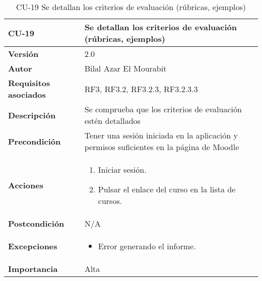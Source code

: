 \begin{table}[H]
	\centering
	\begin{tabularx}{\linewidth}{ p{} p{} }
		\toprule
		\textbf{CU-19}    & \textbf{Se detallan los criterios de evaluación (rúbricas, ejemplos)}\\
		\toprule
		\textbf{Versión}              & 2.0    \\
		\textbf{Autor}                & Bilal Azar El Mourabit \\
		\textbf{Requisitos asociados} & RF3, RF3.2, RF3.2.3, RF3.2.3.3 \\
		\textbf{Descripción}          & Se comprueba que los criterios de evaluación estén detallados\\
    		\textbf{Precondición}         & Tener una sesión iniciada en la aplicación y permisos suficientes en la página de Moodle\\
		\textbf{Acciones}             & 
		\begin{enumerate}
			\def\labelenumi{\arabic{enumi}.}
			\tightlist
			\item Iniciar sesión.
            \item Pulsar el enlace del curso en la lista de cursos. 
		\end{enumerate}\\
		\textbf{Postcondición}        & N/A \\
		\textbf{Excepciones}          & \begin{itemize}
		    \item Error generando el informe.
		\end{itemize} \\
		\textbf{Importancia}          & Alta \\
		\bottomrule
	\end{tabularx}
	\caption{CU-19 Se detallan los criterios de evaluación (rúbricas, ejemplos)}
\end{table}

